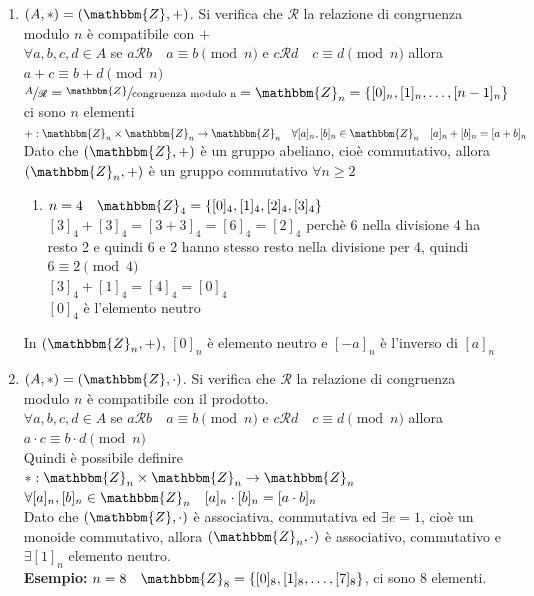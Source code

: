 \documentclass[12pt, letterpaper]{report}
\begin{document}
		\begin{enumerate}
			\item $(A, *) = (\mathbbm{Z}, +)$. Si verifica che $\mathscr{R}$ la relazione di congruenza modulo $n$ è compatibile con $+$ \\
			$\forall a,b,c,d \in A$ se $a\mathscr{R}b \quad a \equiv b \pmod{n}$ e $c\mathscr{R}d \quad c \equiv d \pmod{n}$ allora $a+c \equiv b+d \pmod{n}$ \\
			$\sfrac{A}{\mathscr{R}} = \sfrac{\mathbbm{Z}}{\text{congruenza modulo n}} = \mathbbm{Z}_n = \{[0]_n, [1]_n, \dots, [n-1]_n\}$ ci sono $n$ elementi  \\
			$+:\mathbbm{Z}_n \times \mathbbm{Z}_n \to \mathbbm{Z}_n \quad \forall [a]_n, [b]_n \in \mathbbm{Z}_n \quad [a]_n + [b]_n = [a + b]_n$ \\
			Dato che $(\mathbbm{Z}, +)$ è un gruppo abeliano, cioè commutativo, allora $(\mathbbm{Z}_n, +)$ è un gruppo commutativo $\forall n \geq 2$
			\begin{enumerate}
				\item $n=4 \quad \mathbbm{Z}_4 = \{[0]_4, [1]_4, [2]_4, [3]_4\}$ \\
				$[3]_4 + [3]_4 = [3 + 3]_4 = [6]_4 = [2]_4$ perchè 6 nella divisione 4 ha resto 2 e quindi 6 e 2 hanno stesso resto nella divisione per 4, quindi $6 \equiv 2 \pmod{4}$ \\
				$[3]_4 + [1]_4 = [4]_4 = [0]_4$ \\
				$[0]_4$ è l'elemento neutro
			\end{enumerate}
			In $(\mathbbm{Z}_n, +)$, $[0]_n$ è elemento neutro e $[-a]_n$ è l'inverso di $[a]_n$
			\item $(A, *) = (\mathbbm{Z}, \cdot)$. Si verifica che $\mathscr{R}$ la relazione di congruenza modulo $n$ è compatibile con il prodotto. \\
			$\forall a,b,c,d \in A$ se $a\mathscr{R}b \quad a \equiv b \pmod{n}$ e $c\mathscr{R}d \quad c \equiv d \pmod{n}$ allora $a\cdot c \equiv b\cdot d \pmod{n}$ \\
			Quindi è possibile definire $*: \mathbbm{Z}_n \times \mathbbm{Z}_n \to \mathbbm{Z}_n$ \\
			$\forall [a]_n, [b]_n \in \mathbbm{Z}_n \quad [a]_n \cdot [b]_n = [a \cdot b]_n$ \\
			Dato che $(\mathbbm{Z}, \cdot)$ è associativa, commutativa ed $\exists e = 1$, cioè un monoide commutativo, allora $(\mathbbm{Z}_n, \cdot)$ è associativo, commutativo e $\exists [1]_n$ elemento neutro. \\
			\textbf{Esempio:} $n =8 \quad \mathbbm{Z}_8 = \{[0]_8, [1]_8, \dots, [7]_8\}$, ci sono 8 elementi. \\

\end{enumerate}
\end{document}
